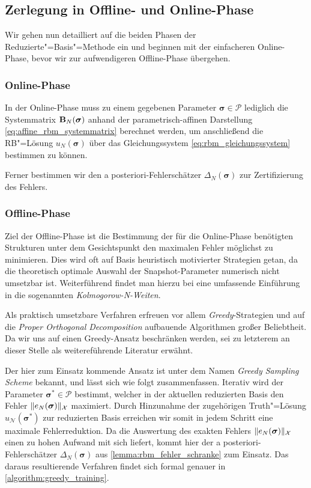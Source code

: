 \documentclass[../main.tex]{subfiles}
\begin{document}
\subsection{Zerlegung in Offline- und Online-Phase} %
\label{sub:zerlegung_in_offline_und_online_phase}

Wir gehen nun detailliert auf die beiden Phasen der Reduzierte"=Basis"=Methode ein und beginnen mit der einfacheren Online-Phase, bevor wir zur aufwendigeren Offline-Phase übergehen.

\subsubsection{Online-Phase} %
\label{ssub:online_phase}

In der Online-Phase muss zu einem gegebenen Parameter $\bm \sigma \in \mathcal P$ lediglich die Systemmatrix $\mathbf{B}_{N}(\bm \sigma)$ anhand der parametrisch-affinen Darstellung \cref{eq:affine_rbm_systemmatrix} berechnet werden, um anschließend die RB"=Lösung $u_{N}(\bm \sigma)$ über das Gleichungssystem \cref{eq:rbm_gleichungssystem} bestimmen zu können.

Ferner bestimmen wir den a posteriori-Fehlerschätzer $\Delta_{N}(\bm \sigma)$ zur Zertifizierung des Fehlers.


\subsubsection{Offline-Phase} %
\label{ssub:offline_phase}

Ziel der Offline-Phase ist die Bestimmung der für die Online-Phase benötigten Strukturen unter dem Gesichtspunkt den maximalen Fehler möglichst zu minimieren.
Dies wird oft auf Basis heuristisch motivierter Strategien getan, da die theoretisch optimale Auswahl der Snapshot-Parameter numerisch nicht umsetzbar ist.
Weiterführend findet man hierzu bei \cite{??} eine umfassende Einführung in die sogenannten \emph{Kolmogorow-N-Weiten}.

Als praktisch umsetzbare Verfahren erfreuen vor allem \emph{Greedy}-Strategien und auf die \emph{Proper Orthogonal Decomposition} aufbauende Algorithmen großer Beliebtheit.
Da wir uns auf einen Greedy-Ansatz beschränken werden, sei zu letzterem an dieser Stelle \cite{} als weitereführende Literatur erwähnt.

Der hier zum Einsatz kommende Ansatz ist unter dem Namen \emph{Greedy Sampling Scheme} bekannt, und lässt sich wie folgt zusammenfassen.
Iterativ wird der Parameter $\bm \sigma^{*} \in \mathcal P$ bestimmt, welcher in der aktuellen reduzierten Basis den Fehler $\lVert e_{N}(\bm \sigma)\rVert_{\mathcal X}$ maximiert.
Durch Hinzunahme der zugehörigen Truth"=Lösung $u_{\mathcal N}(\bm \sigma^{*})$ zur reduzierten Basis erreichen wir somit in jedem Schritt eine maximale Fehlerreduktion.
Da die Auswertung des exakten Fehlers $\lVert e_{N}(\bm \sigma)\rVert_{\mathcal X}$ einen zu hohen Aufwand mit sich liefert, kommt hier der a posteriori-Fehlerschätzer $\Delta_{N}(\bm \sigma)$ aus \cref{lemma:rbm_fehler_schranke} zum Einsatz.
Das daraus resultierende Verfahren findet sich formal genauer in \cref{algorithm:greedy_training}.
\end{document}

